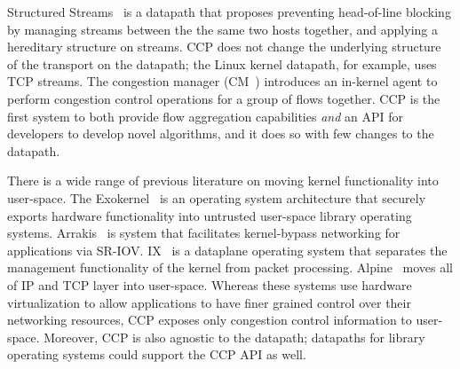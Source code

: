Structured Streams~\cite{structuredstreams} is a datapath that proposes preventing head-of-line blocking by managing streams between the the same two hosts together, and applying a hereditary structure on streams. CCP does not change the underlying structure of the transport on the datapath; the Linux kernel datapath, for example, uses TCP streams. The congestion manager (CM~\cite{cm}) introduces an in-kernel agent to perform congestion control operations for a group of flows together. CCP is the first system to both provide flow aggregation capabilities \textit{and} an API for developers to develop novel algorithms, and it does so with few changes to the datapath.

There is a wide range of previous literature on moving kernel functionality into user-space. 
The Exokernel~\cite{exokernel} is an operating system architecture that securely
exports hardware functionality into untrusted user-space library operating systems.  
Arrakis~\cite{arrakis2014} is system that facilitates kernel-bypass networking for applications via SR-IOV. 
IX~\cite{ix} is a dataplane operating system that separates the management functionality of the kernel from packet processing. 
Alpine~\cite{alpine} moves all of IP and TCP layer into user-space.
Whereas these systems use hardware virtualization to allow applications to have finer grained control over their networking resources,
CCP exposes only congestion control information to user-space. 
Moreover, CCP is also agnostic to the datapath; datapaths for library operating systems could support the CCP API as well.
